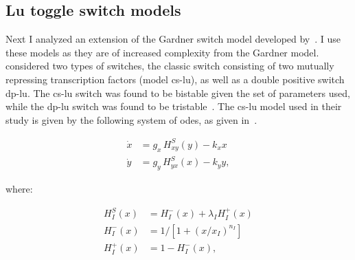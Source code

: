 \clearpage


\subsection{Lu toggle switch models}
\label{sec:lu}
Next I analyzed an extension of the Gardner switch model developed by~\textcite{Lu:2014kc}. I use these models as they are of increased complexity from the Gardner model. \textcite{Lu:2014kc} considered two types of switches, the classic switch consisting of two mutually repressing transcription factors (model \acrshort{cs-lu}), as well as a double positive switch \acrshort{dp-lu}.  The \acrshort{cs-lu} switch was found to be bistable given the set of parameters used, while the \acrshort{dp-lu} switch was found to be tristable~\autocite{Lu:2014kc}. The \acrshort{cs-lu} model used in their study is given by the following system of \acrshort{ode}s, as given in~\textcite{Lu:2014kc}.

\begin{align}
\dot{x} & = g_{x}\, H^{S}_{xy}(y) -k_{x}x \\
\dot{y} & = g_{y}\,H^{S}_{yx}(x) -k_{y}y,
\end{align}

\noindent where:

\begin{align}
H^{S}_{I}(x) &= H^{-}_{I}(x)+\lambda_{I}H^{+}_{I}(x) \\
H^{-}_{I}(x) &= 1 \big/\left[1+(x/x_{I})^{n_{I}}\right] \\
H^{+}_{I}(x) &= 1-H^{-}_{I}(x),
\end{align}

